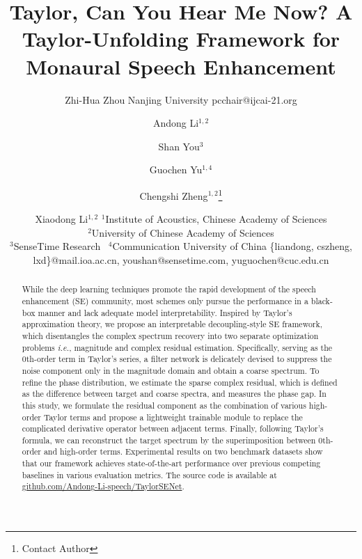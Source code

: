 \documentclass{article}
\title{{Taylor, Can You Hear Me Now?} A Taylor-Unfolding Framework for Monaural Speech Enhancement}
\author{
    Zhi-Hua Zhou
    \affiliations
    Nanjing University
    \emails
    pcchair@ijcai-21.org
}
\author{
Andong Li$^{1,2}$
\and
Shan You$^{3}$\and
Guochen Yu$^{1, 4}$\and
Chengshi Zheng$^{1,2}$\thanks{Contact Author}\and%
Xiaodong Li$^{1,2}$
\affiliations
$^1$Institute of Acoustics, Chinese Academy of Sciences\\
$^2$University of Chinese Academy of Sciences\\
$^3$SenseTime Research \  $^4$Communication University of China
\emails 
\{liandong, cszheng, lxd\}@mail.ioa.ac.cn, youshan@sensetime.com, yuguochen@cuc.edu.cn
}
\begin{document}
\maketitle
\begin{abstract}
While the deep learning techniques promote the rapid development of the speech enhancement (SE) community, most schemes only pursue the performance in a black-box manner and lack adequate model interpretability. Inspired by Taylor's approximation theory, we propose an interpretable decoupling-style SE framework, which disentangles the complex spectrum recovery into two separate optimization problems \emph{i.e.}, magnitude and complex residual estimation. Specifically, serving as the 0th-order term in Taylor's series, a filter network is delicately devised to suppress the noise component only in the magnitude domain and obtain a coarse spectrum. To refine the phase distribution, we estimate the sparse complex residual, which is defined as the difference between target and coarse spectra, and measures the phase gap. In this study, we formulate the residual component as the combination of various high-order Taylor terms and propose a lightweight trainable module to replace the complicated derivative operator between adjacent terms. Finally, following Taylor's formula, we can reconstruct the target spectrum by the superimposition between 0th-order and high-order terms. Experimental results on two benchmark datasets show that our framework achieves state-of-the-art performance over previous competing baselines in various evaluation metrics. The source code is available at \href{https://github.com/Andong-Li-speech/TaylorSENet}{github.com/Andong-Li-speech/TaylorSENet}.
\end{abstract}
\end{document}
